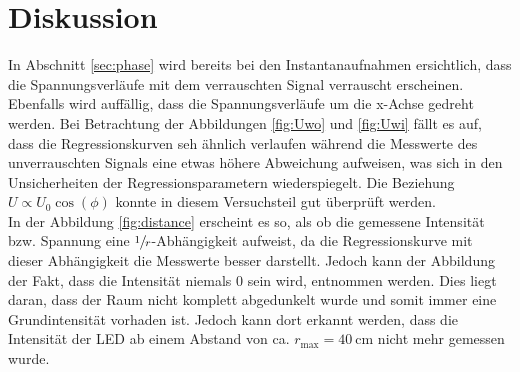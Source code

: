 \section{Diskussion}
\label{sec:Diskussion}
In Abschnitt \ref{sec:phase} wird bereits bei den Instantanaufnahmen ersichtlich, dass die Spannungsverläufe mit dem verrauschten Signal
verrauscht erscheinen. 
Ebenfalls wird auffällig, dass die Spannungsverläufe um die x-Achse gedreht werden.
Bei Betrachtung der Abbildungen \ref{fig:Uwo} und \ref{fig:Uwi} fällt es auf, dass die Regressionskurven seh ähnlich verlaufen während die Messwerte 
des unverrauschten Signals eine etwas höhere Abweichung aufweisen, was sich in den Unsicherheiten der Regressionsparametern
wiederspiegelt.
Die Beziehung $U \propto U_0 \cos (\phi )$ konnte in diesem Versuchsteil gut überprüft werden.\\
In der Abbildung \ref{fig:distance} erscheint es so, als ob die gemessene Intensität bzw. Spannung eine 
$\sfrac{1}{r}$-Abhängigkeit aufweist, da die Regressionskurve mit dieser Abhängigkeit die Messwerte besser darstellt.
Jedoch kann der Abbildung der Fakt, dass die Intensität niemals 0 sein wird, entnommen werden.
Dies liegt daran, dass der Raum nicht komplett abgedunkelt wurde und somit immer eine Grundintensität vorhaden ist.
Jedoch kann dort erkannt werden, dass die Intensität der LED ab einem Abstand von ca. $r_\text{max} = \SI{40}{\centi\metre}$ nicht mehr gemessen wurde. 